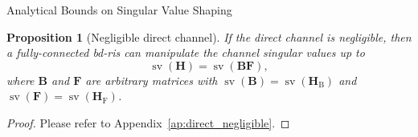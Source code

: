 \documentclass[journal]{IEEEtran}
\DeclareMathOperator{\sv}{sv}
\newtheorem{proposition}{Proposition}
\begin{document}
\begin{section}{Analytical Bounds on Singular Value Shaping}
\begin{proposition}[Negligible direct channel]
			If the direct channel is negligible, then a fully-connected \gls{bd}-\gls{ris} can manipulate the channel singular values up to
			\begin{equation}
				\sv(\mathbf{H}) = \sv(\mathbf{BF}),
				\label{eq:sv_fully_connected}
			\end{equation}
			where $\mathbf{B}$ and $\mathbf{F}$ are arbitrary matrices with $\sv(\mathbf{B})=\sv(\mathbf{H}_\mathrm{B})$ and $\sv(\mathbf{F})=\sv(\mathbf{H}_\mathrm{F})$.
		\end{proposition}

		\begin{proof}
			Please refer to Appendix~\ref{ap:direct_negligible}.
		\end{proof}


\end{section}
\end{document}
